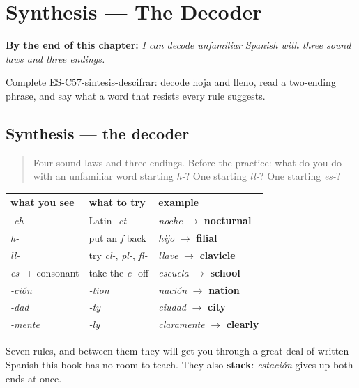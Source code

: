 
\chapter{Synthesis --- The Decoder}
\label{ch:synthesis-sound-laws}

\begin{chapteropening}
\textbf{By the end of this chapter:} \emph{I can decode unfamiliar Spanish with three sound laws and three endings.}

Complete ES-C57-sintesis-descifrar: decode hoja and lleno, read a two-ending phrase, and say what a word that resists every rule suggests.
\end{chapteropening}

\section[Practice]{Synthesis — the decoder}

\label{lesson:ES-C57-sintesis-descifrar}



\begin{quote}
Four sound laws and three endings. Before the practice: what do you do with an unfamiliar word starting \emph{h-}? One starting \emph{ll-}? One starting \emph{es-}?
\end{quote}

\begin{grammarlens}[title={What you've built}]
\noindent
\begin{tabularx}{\linewidth}{@{}>{\raggedright\arraybackslash}X>{\raggedright\arraybackslash}X>{\raggedright\arraybackslash}X@{}}
\toprule
\textbf{what you see} & \textbf{what to try} & \textbf{example} \\
\midrule
\emph{-ch-} & Latin \emph{-ct-} & \emph{noche} $\to$ \textbf{nocturnal} \\
\emph{h-} & put an \emph{f} back & \emph{hijo} $\to$ \textbf{filial} \\
\emph{ll-} & try \emph{cl-}, \emph{pl-}, \emph{fl-} & \emph{llave} $\to$ \textbf{clavicle} \\
\emph{es-} + consonant & take the \emph{e-} off & \emph{escuela} $\to$ \textbf{school} \\
\emph{-ción} & \emph{-tion} & \emph{nación} $\to$ \textbf{nation} \\
\emph{-dad} & \emph{-ty} & \emph{ciudad} $\to$ \textbf{city} \\
\emph{-mente} & \emph{-ly} & \emph{claramente} $\to$ \textbf{clearly} \\
\bottomrule
\end{tabularx}

Seven rules, and between them they will get you through a great deal of written Spanish this book has no room to teach. They also \textbf{stack}: \emph{estación} gives up both ends at once.
\end{grammarlens}

